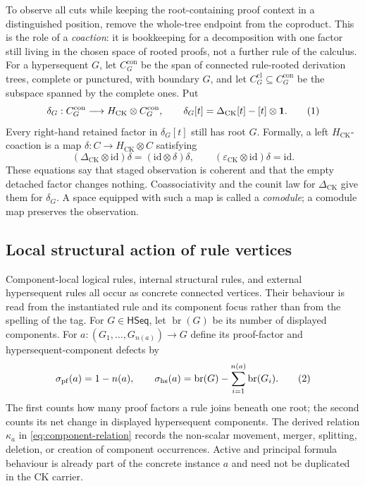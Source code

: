 \documentclass[10pt,a4paper]{article}
\theoremstyle{plain}
\theoremstyle{definition}
\theoremstyle{remark}
\newcommand{\HCK}{H_{\mathrm{CK}}}
\newcommand{\DeltaCK}{\Delta_{\mathrm{CK}}}
\newcommand{\epsCK}{\varepsilon_{\mathrm{CK}}}
\newcommand{\HSeq}{\mathsf{HSeq}}
\newcommand{\one}{\mathbf 1}
\newcommand{\br}{\operatorname{br}}
\newcommand{\eqtag}{\refstepcounter{equation}\tag{\theequation}}
\begin{document}
To observe all cuts while keeping the root-containing proof context in a
distinguished position, remove the whole-tree endpoint from the
coproduct.  This is the role of a \emph{coaction}: it is bookkeeping for a
decomposition with one factor still living in the chosen space of rooted
proofs, not a further rule of the calculus.  For a hypersequent \(G\), let
\(C_G^{\mathrm{con}}\) be the span of connected rule-rooted derivation
trees, complete or punctured, with boundary \(G\), and let
\(C_G^{\mathrm{cl}}\subseteq C_G^{\mathrm{con}}\) be the subspace spanned by
the complete ones.  Put
\[
 \delta_G:C_G^{\mathrm{con}}\longrightarrow
     \HCK\otimes C_G^{\mathrm{con}},\qquad
 \delta_G[t]=\DeltaCK[t]-[t]\otimes\one .
\eqtag\label{eq:root-coaction}
\]
Every right-hand retained factor in \(\delta_G[t]\) still has root \(G\).
Formally, a left \(\HCK\)-coaction is a map
\(\delta:C\to\HCK\otimes C\) satisfying
\[
 (\DeltaCK\otimes\mathrm{id})\delta
   =(\mathrm{id}\otimes\delta)\delta,\qquad
 (\epsCK\otimes\mathrm{id})\delta=\mathrm{id}.
\]
These equations say that staged observation is coherent and that the empty
detached factor changes nothing.  Coassociativity and the counit law for
\(\DeltaCK\) give them for \(\delta_G\).  A space equipped with such a map
is called a \emph{comodule}; a comodule map preserves the observation.

\subsection{Local structural action of rule vertices}
\label{subsec:structural-footprints}

Component-local logical rules, internal structural rules, and external
hypersequent rules all occur as concrete connected vertices.  Their
behaviour is read from the instantiated rule and its component focus rather
than from the spelling of the tag.  For
\(G\in\HSeq\), let \(\br(G)\) be its number of displayed components.
For
\(
 a:(G_1,\ldots,G_{n(a)})\to G
\)
define its proof-factor and hypersequent-component defects by
\[
 \sigma_{\mathrm{pf}}(a)=1-n(a),
 \qquad
 \sigma_{\mathrm{hs}}(a)
   =\br(G)-\sum_{i=1}^{n(a)}\br(G_i).
\eqtag\label{eq:local-structural-defects}
\]
The first counts how many proof factors a rule joins beneath one root; the
second counts its net change in displayed hypersequent components.  The
derived relation \(\kappa_a\) in \eqref{eq:component-relation} records the
non-scalar movement, merger, splitting, deletion, or creation of component
occurrences.  Active and principal formula behaviour is already part of the
concrete instance \(a\) and need not be duplicated in the CK carrier.
\end{document}
